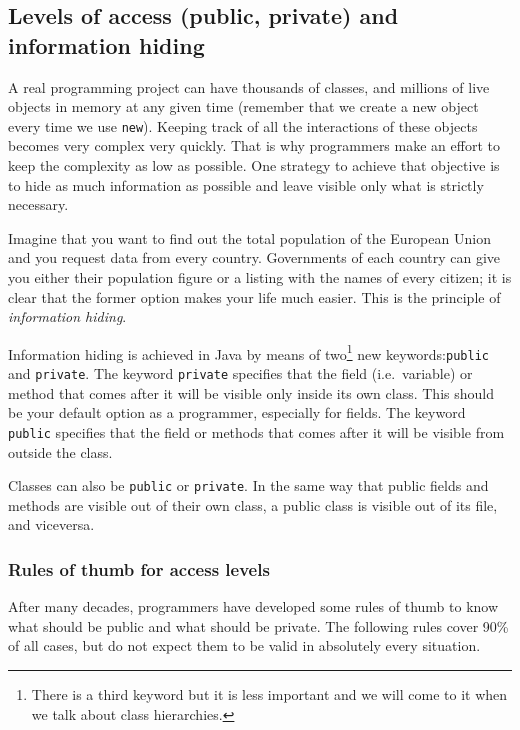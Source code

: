 \subsection{Levels of access (public, private) and information hiding}
\label{sec:levels-access-inform}

A real programming project can have thousands of classes, and millions
of live objects in memory at any given time (remember that we create a
new object every time we use \verb+new+). Keeping track of all the
interactions of these objects becomes very complex very quickly. That
is why programmers make an effort to keep 
the complexity as low as possible. One
strategy to achieve that objective is 
to hide as much information as possible
and leave visible only what is strictly necessary. 

Imagine that you want to find out the total population of the European
Union and you request data from every country. Governments of each
country can give you either their population figure or a listing with
the names of every citizen; it is clear that the former option makes
your life much easier. This is the principle of \emph{information
  hiding}. 

Information hiding is achieved in Java by means of two\footnote{There
  is a third keyword but it is 
less important and we will come to it when we talk about class
hierarchies.} new keywords:\verb+public+ and \verb+private+. 
The keyword \verb+private+ specifies that the field (i.e.~variable) or
method that comes after it will be visible only inside its own
class. This should be your default option as a programmer, especially
for fields. The keyword \verb+public+ specifies that the field or
methods that comes after it will be visible from outside the class. 

Classes can also be \verb+public+ or \verb+private+. In the same way
that public fields and methods are visible out of their own class, a
public class is visible out of its file, and viceversa. 


\subsubsection*{Rules of thumb for access levels}
\label{sec:rules-thumb-access}

After many decades, programmers have developed some rules of thumb
to know what should be public and what should be private. The
following rules cover 90\% of all cases, but do not expect them to be
valid in absolutely every situation. 

